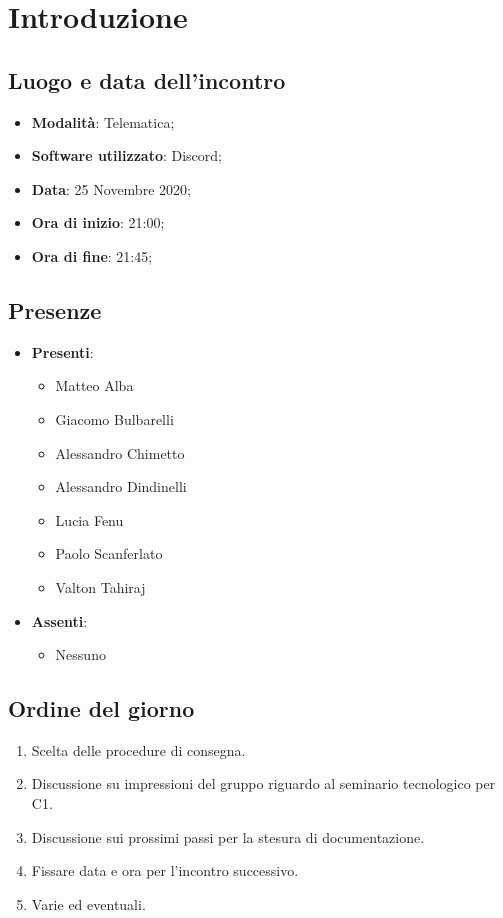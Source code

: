 \documentclass[]{article}
\begin{document}
	
	
	\newpage
	
	\section{Introduzione}
		\subsection{Luogo e data dell'incontro}
		\begin{itemize}
			\item \textbf{Modalità}: Telematica;
			\item \textbf{Software utilizzato}: Discord;
			\item \textbf{Data}: 25 Novembre 2020;
			\item \textbf{Ora di inizio}: 21:00;
			\item \textbf{Ora di fine}: 21:45;
		\end{itemize}
		
		\subsection{Presenze}
		\begin{itemize}
			\item \textbf{Presenti}: 
			\begin{itemize}
				\item Matteo Alba
				\item Giacomo Bulbarelli
				\item Alessandro Chimetto
				\item Alessandro Dindinelli
				\item Lucia Fenu
				\item Paolo Scanferlato
				\item Valton Tahiraj
			\end{itemize}
			\item \textbf{Assenti}:
			\begin{itemize}
				\item Nessuno
			\end{itemize}
		\end{itemize}
		
		\subsection{Ordine del giorno}
		\begin{enumerate}
			\item Scelta delle procedure di consegna.
			\item Discussione su impressioni del gruppo riguardo al seminario
			tecnologico per C1.
			\item Discussione sui prossimi passi per la stesura di documentazione.
			\item Fissare data e ora per l'incontro successivo.
			\item Varie ed eventuali.
		\end{enumerate}
	
\end{document}
